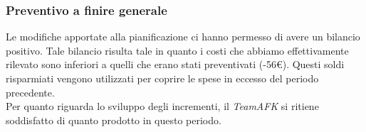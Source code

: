 \subsubsection{Preventivo a finire generale}
Le modifiche apportate alla pianificazione ci hanno permesso di avere un
bilancio positivo. Tale bilancio risulta tale in quanto i costi che abbiamo effettivamente rilevato sono inferiori a quelli che erano stati preventivati (-56€). Questi soldi risparmiati vengono utilizzati per coprire le spese in eccesso del periodo precedente.\\
Per quanto riguarda lo sviluppo degli incrementi, il \textit{TeamAFK} si ritiene soddisfatto di quanto prodotto in questo periodo.